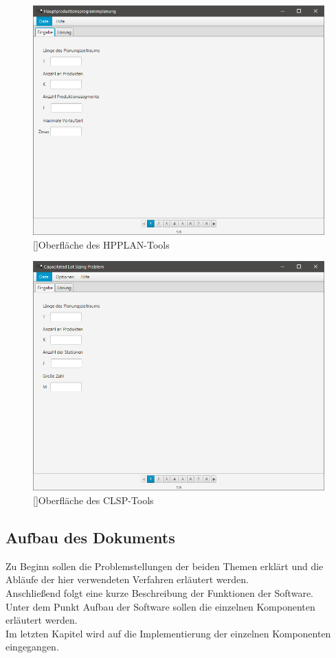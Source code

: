 \documentclass[12pt,a4paper, listof=entryprefix, bibliography=totocnumbered,toc=listofnumbered,lof=listofnumbered]{scrartcl}
\begin{document}
\begin{figure}[H]
	\centering
	\includegraphics[width=1.0\linewidth]{images/HPPLAN_GUI.png} 
	[]{Oberfläche des HPPLAN-Tools}
	\label{fig:hpplangui}
\end{figure}

\begin{figure}[H]
	\centering
	\includegraphics[width=1.0\linewidth]{images/CLSP_GUI.png} 
	[]{Oberfläche des CLSP-Tools}
	\label{fig:clspgui}
\end{figure}

\subsection{Aufbau des Dokuments}
Zu Beginn sollen die Problemstellungen der beiden Themen erklärt und die Abläufe der hier verwendeten Verfahren erläutert werden.
\\
Anschließend folgt eine kurze Beschreibung der Funktionen der Software.
\\
Unter dem Punkt Aufbau der Software sollen die einzelnen Komponenten erläutert werden.
\\
Im letzten Kapitel wird auf die Implementierung der einzelnen Komponenten eingegangen.
\end{document}
